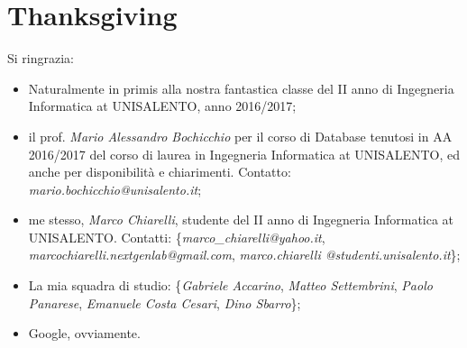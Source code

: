 \documentclass[11 pt,a4paper,twoside,openany]{book}
\begin{document}
\mainmatter







\backmatter


\newpage

\section*{Thanksgiving}

Si ringrazia:

\begin{itemize}

\item Naturalmente in primis alla nostra fantastica classe del II anno di Ingegneria Informatica at UNISALENTO, anno 2016/2017;

\item il prof. \emph{Mario Alessandro Bochicchio} per il corso di Database tenutosi in AA 2016/2017 del corso di laurea in Ingegneria Informatica at UNISALENTO, ed anche per disponibilità e chiarimenti. Contatto: \emph{mario.bochicchio@unisalento.it};

\item me stesso, \emph{Marco Chiarelli}, studente del II anno di Ingegneria Informatica at UNISALENTO. Contatti: \{\emph{marco\_chiarelli@yahoo.it}, \emph{marcochiarelli.nextgenlab@gmail.com}, \emph{marco.chiarelli @studenti.unisalento.it}\};

\item La mia squadra di studio: \{\emph{Gabriele Accarino}, \emph{Matteo Settembrini}, \emph{Paolo Panarese}, \emph{Emanuele Costa Cesari}, \emph{Dino Sbarro}\};

\item Google, ovviamente.

\end{itemize}

\newpage
\end{document}
